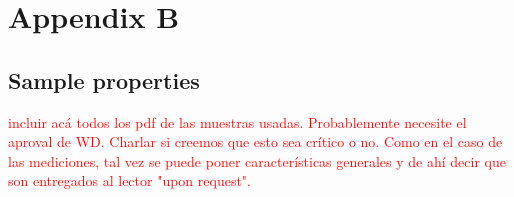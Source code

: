 \chapter{Appendix B}
\label{appendixb}

\section{Sample properties}

\textcolor{red}{incluir acá todos los pdf de las muestras usadas. Probablemente necesite el aproval de WD. Charlar si creemos que esto sea crítico o no. Como en el caso de las mediciones, tal vez se puede poner características generales y de ahí decir que son entregados al lector "upon request".}